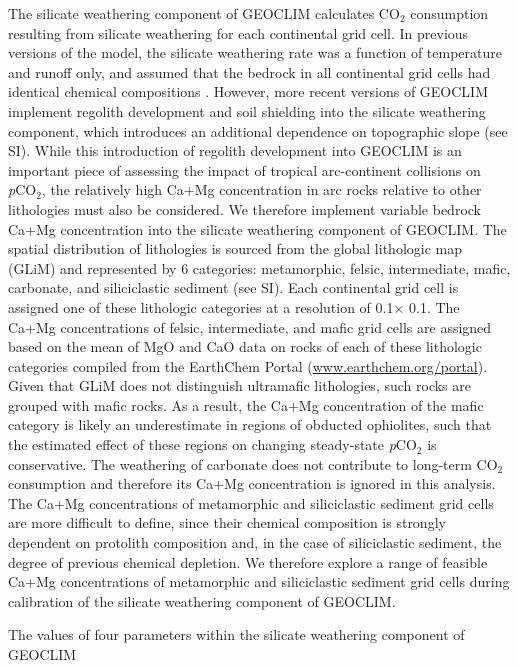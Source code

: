 \documentclass[11pt,letterpaper]{article}
\newcommand{\degrees}{\textdegree\xspace}
\newcommand{\pCOtwo}{\textit{p}CO$_{2}$\xspace}
\newcommand{\COtwo}{CO$_{2}$\xspace}
\begin{document}
The silicate weathering component of GEOCLIM calculates \COtwo consumption resulting from silicate weathering for each continental grid cell. In previous versions of the model, the silicate weathering rate was a function of temperature and runoff only, and assumed that the bedrock in all continental grid cells had identical chemical compositions \cite{Godderis2014a}. However, more recent versions of GEOCLIM implement regolith development and soil shielding into the silicate weathering component, which introduces an additional dependence on topographic slope (see SI). While this introduction of regolith development into GEOCLIM is an important piece of assessing the impact of tropical arc-continent collisions on \pCOtwo, the relatively high Ca+Mg concentration in arc rocks relative to other lithologies must also be considered. We therefore implement variable bedrock Ca+Mg concentration into the silicate weathering component of GEOCLIM. The spatial distribution of lithologies is sourced from the global lithologic map (GLiM) \cite{Hartmann2012a} and represented by 6 categories: metamorphic, felsic, intermediate, mafic, carbonate, and siliciclastic sediment (see SI). Each continental grid cell is assigned one of these lithologic categories at a resolution of 0.1\degrees $\times$ 0.1\degrees. The Ca+Mg concentrations of felsic, intermediate, and mafic grid cells are assigned based on the mean of MgO and CaO data on rocks of each of these lithologic categories compiled from the EarthChem Portal (\url{www.earthchem.org/portal}). Given that GLiM does not distinguish ultramafic lithologies, such rocks are grouped with mafic rocks. As a result, the Ca+Mg concentration of the mafic category is likely an underestimate in regions of obducted ophiolites, such that the estimated effect of these regions on changing steady-state \pCOtwo is conservative. The weathering of carbonate does not contribute to long-term \COtwo consumption and therefore its Ca+Mg concentration is ignored in this analysis. The Ca+Mg concentrations of metamorphic and siliciclastic sediment grid cells are more difficult to define, since their chemical composition is strongly dependent on protolith composition and, in the case of siliciclastic sediment, the degree of previous chemical depletion. We therefore explore a range of feasible Ca+Mg concentrations of metamorphic and siliciclastic sediment grid cells during calibration of the silicate weathering component of GEOCLIM.

The values of four parameters within the silicate weathering component of GEOCLIM
\end{document}
